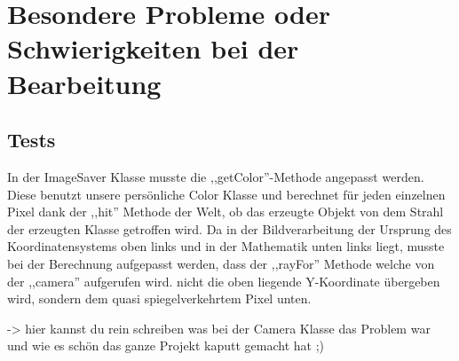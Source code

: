 \documentclass[14pt]{extarticle}
\begin{document}
\section{Besondere Probleme oder Schwierigkeiten bei der Bearbeitung}
\subsection{Tests}
In der ImageSaver Klasse musste die ,,getColor''-Methode angepasst werden. Diese benutzt unsere persönliche Color Klasse und berechnet für jeden einzelnen Pixel dank der ,,hit'' Methode der Welt, ob das erzeugte Objekt von dem Strahl der erzeugten Klasse getroffen wird. Da in der Bildverarbeitung der Ursprung des Koordinatensystems oben links und in der Mathematik unten links liegt, musste bei der Berechnung aufgepasst werden, dass der ,,rayFor'' Methode welche von der ,,camera'' aufgerufen wird. nicht die oben liegende Y-Koordinate übergeben wird, sondern dem quasi spiegelverkehrtem Pixel unten. 

-> hier kannst du rein schreiben was bei der Camera Klasse das Problem war und wie es schön das ganze Projekt kaputt gemacht hat ;) 
\end{document}
